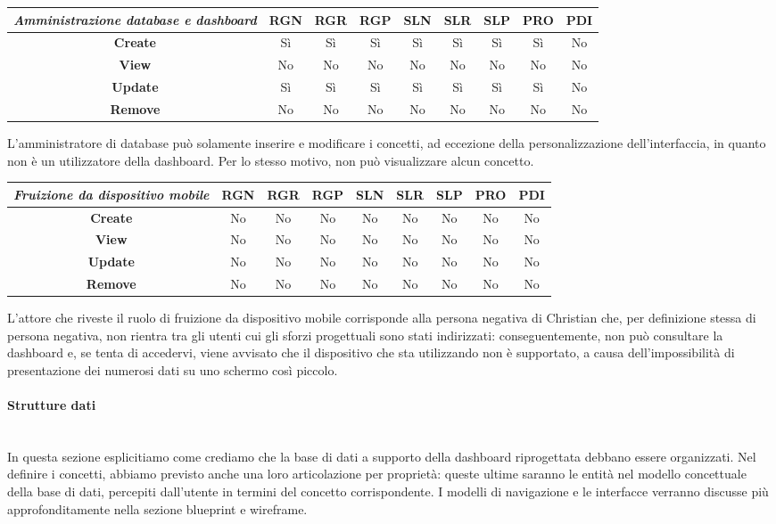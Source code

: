 {
\renewcommand{\arraystretch}{2}
\begin{longtable}[h]{| c | c | c | c | c | c | c | c | c |}
    \hline
    \textit{Amministrazione database e dashboard} & \textbf{RGN} & \textbf{RGR} & \textbf{RGP} & \textbf{SLN} & \textbf{SLR} & \textbf{SLP} & \textbf{PRO} & \textbf{PDI} \\
    \hline
    \endhead
    \textbf{Create} & Sì & Sì & Sì & Sì & Sì & Sì & Sì & No \\
    \hline
    \textbf{View}   & No & No & No & No & No & No & No & No \\
    \hline
    \textbf{Update} & Sì & Sì & Sì & Sì & Sì & Sì & Sì & No \\
    \hline
    \textbf{Remove} & No & No & No & No & No & No & No & No \\
    \hline
\end{longtable}
}
\noindent
L'amministratore di database può solamente inserire e modificare i concetti, ad eccezione della personalizzazione dell'interfaccia, in quanto non è un utilizzatore della dashboard.
Per lo stesso motivo, non può visualizzare alcun concetto.

{
\renewcommand{\arraystretch}{2}
\begin{longtable}[h]{| c | c | c | c | c | c | c | c | c |}
    \hline
    \textit{Fruizione da dispositivo mobile} & \textbf{RGN} & \textbf{RGR} & \textbf{RGP} & \textbf{SLN} & \textbf{SLR} & \textbf{SLP} & \textbf{PRO} & \textbf{PDI} \\
    \hline
    \endhead
    \textbf{Create} & No & No & No & No & No & No & No & No \\
    \hline
    \textbf{View}   & No & No & No & No & No & No & No & No \\
    \hline
    \textbf{Update} & No & No & No & No & No & No & No & No \\
    \hline
    \textbf{Remove} & No & No & No & No & No & No & No & No \\
    \hline
\end{longtable}
}
\noindent
L'attore che riveste il ruolo di fruizione da dispositivo mobile corrisponde alla persona negativa di Christian che, per definizione stessa di persona negativa, non rientra tra gli utenti cui gli sforzi progettuali sono stati indirizzati: conseguentemente, non può consultare la dashboard e, se tenta di accedervi, viene avvisato che il dispositivo che sta utilizzando non è supportato, a causa dell'impossibilità di presentazione dei numerosi dati su uno schermo così piccolo.

\paragraph{Strutture dati}\mbox{}\\
In questa sezione esplicitiamo come crediamo che la base di dati a supporto della dashboard riprogettata debbano essere organizzati. Nel definire i concetti, abbiamo previsto anche una loro articolazione per proprietà: queste ultime saranno le entità nel modello concettuale della base di dati, percepiti dall'utente in termini del concetto corrispondente.
I modelli di navigazione e le interfacce verranno discusse più approfonditamente nella sezione blueprint e wireframe.